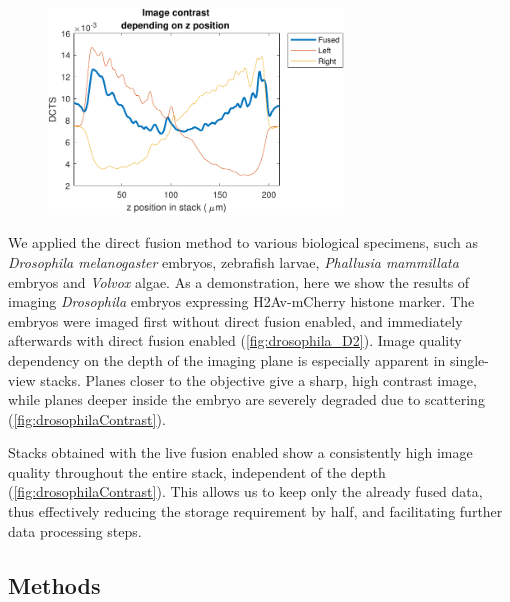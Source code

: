   \begin{figure}
    \centering
    \includegraphics[width=0.7\textwidth]{fusion/drosophilaContrast}
    \label{fig:drosophilaContrast}
  \end{figure}

  We applied the direct fusion method to various biological specimens, such as \textit{Drosophila melanogaster} embryos, zebrafish larvae, \textit{Phallusia mammillata} embryos and \textit{Volvox} algae. As a demonstration, here we show the results of imaging \textit{Drosophila} embryos expressing H2Av-mCherry histone marker. The embryos were imaged first without direct fusion enabled, and immediately afterwards with direct fusion enabled (\autoref{fig:drosophila_D2}). Image quality dependency on the depth of the imaging plane is especially apparent in single-view stacks. Planes closer to the objective give a sharp, high contrast image, while planes deeper inside the embryo are severely degraded due to scattering (\autoref{fig:drosophilaContrast}).

  Stacks obtained with the live fusion enabled show a consistently high image quality throughout the entire stack, independent of the depth (\autoref{fig:drosophilaContrast}). This allows us to keep only the already fused data, thus effectively reducing the storage requirement by half, and facilitating further data processing steps.

  \subsection{Methods}

